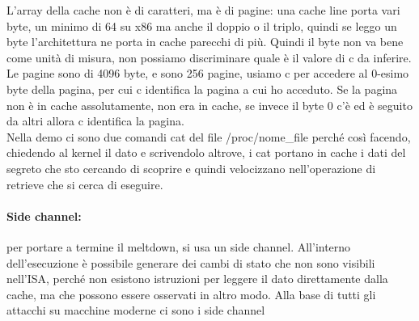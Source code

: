 \documentclass[12pt, oneside]{extbook}
\begin{document}
L'array della cache non è di caratteri, ma è di pagine: una cache line porta vari byte, un minimo di 64 su x86 ma anche il doppio o il triplo, quindi se leggo un byte l'architettura ne porta in cache parecchi di più. Quindi il byte non va bene come unità di misura, non possiamo discriminare quale è il valore di c da inferire.\\ Le pagine sono di 4096 byte, e sono 256 pagine, usiamo c per accedere al 0-esimo byte della pagina, per cui c identifica la pagina a cui ho acceduto. Se la pagina non è in cache assolutamente, non era in cache, se invece il byte 0 c'è ed è seguito da altri allora c identifica la pagina.\\ Nella demo ci sono due comandi cat del file /proc/nome\_file perché così facendo, chiedendo al kernel il dato e scrivendolo altrove, i cat portano in cache i dati del segreto che sto cercando di scoprire e quindi velocizzano nell'operazione di retrieve che si cerca di eseguire.
\paragraph{Side channel:}per portare a termine il meltdown, si usa un side channel. All'interno dell'esecuzione è possibile generare dei cambi di stato che non sono visibili nell'ISA, perché non esistono istruzioni per leggere il dato direttamente dalla cache, ma che possono essere osservati in altro modo. Alla base di tutti gli attacchi su macchine moderne ci sono i side channel
\end{document}
